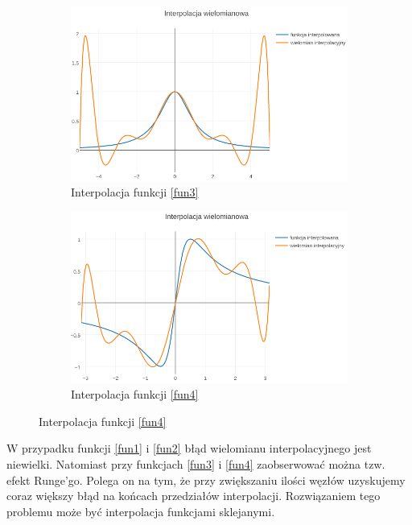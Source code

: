 \documentclass{article}
\begin{document}
\begin{figure}[ht]
	\centering
	\begin{subfigure}[ht]{0.5\textwidth}
		\includegraphics[width=\textwidth]{lagrange_c}
		\caption{Interpolacja funkcji \eqref{fun3}}
		\label{fig:2}
	\end{subfigure}%
	\begin{subfigure}[ht]{0.5\textwidth}
		\includegraphics[width=\textwidth]{lagrange_d}
		\caption{Interpolacja funkcji \eqref{fun4}}
		\label{fig:3}
	\end{subfigure}
\end{figure}

W przypadku funkcji \eqref{fun1} i \eqref{fun2} błąd wielomianu interpolacyjnego jest niewielki. Natomiast przy funkcjach \eqref{fun3} i \eqref{fun4} zaobserwować można tzw. efekt Runge'go\cite{runge}. Polega on na tym, że przy zwiększaniu ilości węzłów uzyskujemy coraz większy błąd na końcach przedziałów interpolacji. Rozwiązaniem tego problemu może być interpolacja funkcjami sklejanymi.
\end{document}

